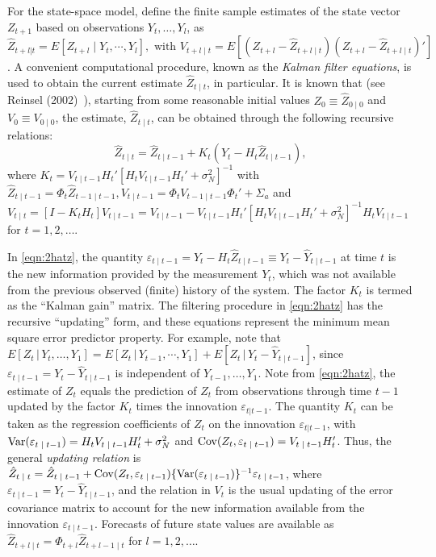For the state-space model, define the finite sample estimates of the state vector $Z_{t+1}$ based on observations $Y_t, \ldots, Y_l$, as $\hat{Z}_{t+l|t} = E[Z_{t+l} \;|\; Y_t,\cdots,Y_l],\text{ with } V_{t+l \;|\; t} = E[(Z_{t+l} - \hat{Z}_{t+l \;|\; t})(Z_{t+l} - \hat{Z}_{t+l \;|\; t})']$. A convenient computational procedure, known as the \emph{Kalman filter equations},\label{in:kalman} is used to obtain the current estimate $\hat{Z}_{t\;|\;t}$, in particular. It is known that (see Reinsel (2002)~\cite{2002reinsel}), starting from some reasonable initial values $Z_0 \equiv \hat{Z}_{0 \;|\; 0}$ and $V_0 \equiv V_{0\;|\;0}$, the estimate, $\hat{Z}_{t \;|\; t}$, can be obtained through the following recursive relations:
	\begin{equation}\label{eqn:2hatz}
	\hat{Z}_{t \;|\; t} = \hat{Z}_{t \;|\; t-1} + K_t(Y_t - H_t \hat{Z}_{t \;|\; t-1}),
	\end{equation}
where $K_t= V_{t \;|\; t-1} H_t'[H_t V_{t \;|\; t-1} H_t' + \sigma_N^2]^{-1}$ with $\hat{Z}_{t \;|\; t-1} = \Phi_t \hat{Z}_{t-1\;|\; t-1},V_{t \;|\; t-1} = \Phi_t V_{t-1\;|\; t-1} \Phi_t' + \Sigma_{a}$ and $V_{t \;|\; t} = [I - K_t H_t] V_{t \;|\; t-1} = V_{t\;|\; t-1} - V_{t\;|\; t-1} H_t' [H_t V_{t \;|\; t-1} H_t' + \sigma_N^2]^{-1} H_t V_{t \;|\; t-1}$ for $t= 1,2, \ldots$.


In \eqref{eqn:2hatz}, the quantity $\varepsilon_{t \;|\; t-1}= Y_t - H_t \hat{Z}_{t \;|\; t-1} \equiv Y_t - \hat{Y}_{t \;|\; t-1}$ at time $t$ is the new information provided by the measurement $Y_t$, which was not available from the previous observed (finite) history of the system. The factor $K_t$ is termed as the ``Kalman gain'' matrix. The filtering procedure in \eqref{eqn:2hatz} has the recursive ``updating'' form, and these equations represent the minimum mean square error predictor property. For example, note that $E[Z_t \,|\,Y_t,\ldots,Y_1]= E[Z_t \,|\,Y_{t-1},\cdots,Y_1] + E[Z_t \,|\, Y_t - \hat{Y}_{t \;|\; t-1}]$, since $\varepsilon_{t \;|\; t-1} = Y_t - \hat{Y}_{t \;|\; t-1}$ is independent of $Y_{t-1}, \ldots, Y_1$. Note from \eqref{eqn:2hatz}, the estimate of $Z_t$ equals the prediction of $Z_t$ from observations through time $t-1$ updated by the factor $K_t$ times the innovation $\varepsilon_{t|t-1}$. The quantity $K_t$ can be taken as the regression coefficients of $Z_t$ on the innovation $\varepsilon_{t|t-1}$, with $\operatorname{Var}(\varepsilon_{t\;|\; t-1}) = H_t V_{t\;|\; t-1} H_t' + \sigma_N^2$ and $\operatorname{Cov}(Z_t,\varepsilon_{t\;|\; t-1})= V_{t \;|\; t-1} H_t'$. Thus, the general \emph{updating relation} is $\hat{Z}_{t\;|\;t} = \hat{Z}_{t\;|\; t-1} + \operatorname{Cov}(Z_t,\varepsilon_{t\;|\; t-1}) \{ \operatorname{Var}(\varepsilon_{t\;|\; t-1}) \}^{-1} \varepsilon_{t\;|\; t-1}$, where $\varepsilon_{t \;|\; t-1} = Y_t - \hat{Y}_{t\;|\; t-1}$, and the relation in $V_t$ is the usual updating of the error covariance matrix to account for the new information available from the innovation $\varepsilon_{t\;|\; t-1}$. Forecasts of future state values are available as $\hat{Z}_{t+l\;|\;t} = \Phi_{t+l} \hat{Z}_{t+l-1\;|\;t}$ for $l = 1,2,\ldots$. 


